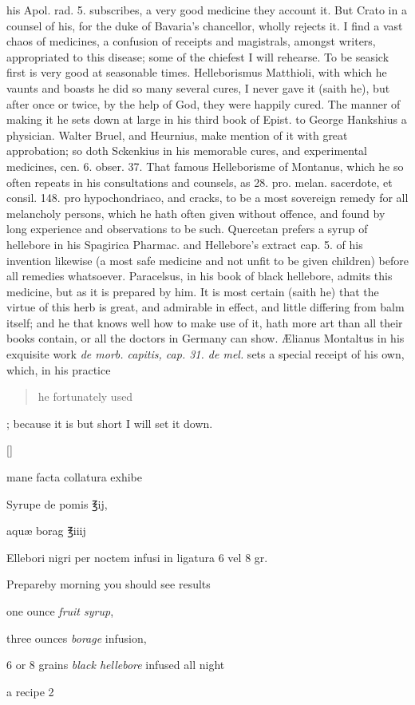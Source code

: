 his Apol. rad. 5. subscribes, a very good medicine they account it. But
Crato in a counsel of his, for the duke of Bavaria's chancellor, wholly
rejects it.
I find a vast chaos of medicines, a confusion of receipts and
magistrals, amongst writers, appropriated to this disease; some of the
chiefest I will rehearse. To be seasick first is very good at
seasonable times. Helleborismus Matthioli, with which he vaunts and
boasts he did so many several cures, I never gave it (saith he),
but after once or twice, by the help of God, they were happily cured.
The manner of making it he sets down at large in his third book of
Epist. to George Hankshius a physician. Walter Bruel, and Heurnius,
make mention of it with great approbation; so doth Sckenkius in his
memorable cures, and experimental medicines, cen. 6. obser. 37. That
famous Helleborisme of Montanus, which he so often repeats in his
consultations and counsels, as 28. pro. melan. sacerdote, et consil.
148. pro hypochondriaco, and cracks,  to be a most sovereign
remedy for all melancholy persons, which he hath often given without
offence, and found by long experience and observations to be such.
Quercetan prefers a syrup of hellebore in his Spagirica Pharmac. and
Hellebore's extract cap. 5. of his invention likewise (a most safe
medicine and not unfit to be given children) before all remedies
whatsoever. 
Paracelsus, in his book of black hellebore, admits this medicine, but
as it is prepared by him. It is most certain (saith he) that the
virtue of this herb is great, and admirable in effect, and little
differing from balm itself; and he that knows well how to make use of
it, hath more art than all their books contain, or all the doctors in
Germany can show.
\AE{}lianus Montaltus in his exquisite work \emph{de morb. capitis, cap. 31. de
mel.} sets a special receipt of his own, which, in his practice \blockquote{he
fortunately used}; because it is but short I will set it down.

\vspace{-\baselineskip}
\begin{Prescription}[H]
[\baselineskip]
\begin{prescriptionbox}{}{\textlatin{mane facta collatura exhibe}}
\item \textlatin{Syrupe de pomis} ℥ij,
\item \textlatin{aqu\ae{} borag ℥iiij}
\item \textlatin{Ellebori nigri per noctem infusi in ligatura 6 vel 8 gr.}
\end{prescriptionbox}
\begin{prescriptionbox}{Prepare}{by morning you should see results}
\item one ounce \emph{fruit syrup},
\item three ounces \emph{borage} infusion,
\item 6 or 8 grains \emph{black hellebore} infused all night
\end{prescriptionbox}
\caption{a recipe 2}
\end{Prescription}


